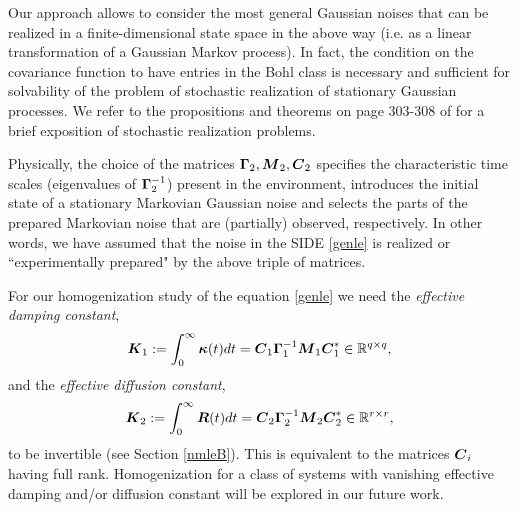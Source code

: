 Our approach allows to consider the most general Gaussian noises that can be realized in a finite-dimensional state space in the above way (i.e. as a linear transformation of a Gaussian Markov process).  In fact, the condition on the covariance function to have entries in the Bohl class is necessary and sufficient for solvability of the problem of stochastic realization of stationary Gaussian processes.  We refer to the propositions and theorems on page 303-308 of \cite{willems1980stochastic} for a brief exposition of  stochastic realization problems.


\begin{remark} Physically, the choice of the matrices  $\boldsymbol{\Gamma}_2,\boldsymbol{M}_2,\boldsymbol{C}_2$ specifies the characteristic time scales (eigenvalues of $\boldsymbol{\Gamma}_2^{-1}$) present in the environment, introduces the initial state of a stationary Markovian Gaussian noise and selects the parts of the prepared Markovian noise that are (partially) observed, respectively.  In other words, we have assumed that the  noise in the SIDE \eqref{genle} is realized or ``experimentally prepared" by the above triple of matrices. 
\end{remark}

For our homogenization study of the equation \eqref{genle} we need the {\it effective damping constant}, 
\begin{equation} \label{eff_damping}
\boldsymbol{K}_1 := \int_0^{\infty} \boldsymbol{\kappa}(t) dt = \boldsymbol{C}_1 \boldsymbol{\Gamma}_1^{-1} \boldsymbol{M}_1 \boldsymbol{C}_1^* \in \mathbb{R}^{q \times q},
\end{equation}
and the {\it effective diffusion constant}, 
\begin{equation} \label{eff_diff}
\boldsymbol{K}_2 := \int_0^{\infty} \boldsymbol{R}(t) dt = \boldsymbol{C}_2 \boldsymbol{\Gamma}_2^{-1} \boldsymbol{M}_2 \boldsymbol{C}_2^* \in \mathbb{R}^{r \times r},
\end{equation}
to be invertible (see Section \ref{nmleB}). This is equivalent to the matrices $\boldsymbol{C}_i$ having full rank. Homogenization for a class of systems with vanishing effective damping and/or diffusion constant \cite{bao2005non} will be explored in our future work. 


